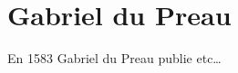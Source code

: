 \documentclass[a4]{article}
\begin{document}
\section{Gabriel du Preau}

En 1583 Gabriel du Preau publie etc…
\end{document}
